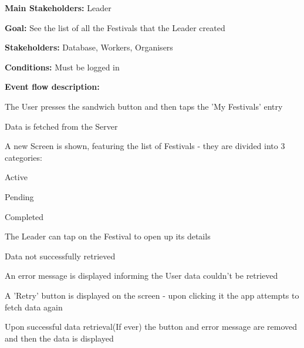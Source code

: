 				\noindent {}
				\begin{packed_item}
					\item \textbf{Main Stakeholders:} Leader
					\item \textbf{Goal:} See the list of all the Festivals that the Leader created
					\item \textbf{Stakeholders: } Database, Workers, Organisers
					\item \textbf{Conditions: } Must be logged in
					\item \textbf{Event flow description: }
					\begin{packed_enum}
						\item The User presses the sandwich button and then taps the 'My Festivals' entry
						\item Data is fetched from the Server
						\item A new Screen is shown, featuring the list of Festivals - they are divided into 3 categories:
							\item[] \begin{packed_enum}
								\item Active
								\item Pending
								\item Completed
							\end{packed_enum}
						\item The Leader can tap on the Festival to open up its details
					\end{packed_enum}
				
					\begin{packed_item}
						\item[1.a, 4.a] Data not successfully retrieved
						\item[] \begin{packed_enum}
							\item An error message is displayed informing the User data couldn't be retrieved
							\item A 'Retry' button is displayed on the screen - upon clicking it the app attempts to fetch data again
							\item Upon successful data retrieval(If ever) the button and error message are removed and then the data is displayed
						\end{packed_enum}	
					\end{packed_item}
				\end{packed_item}
			
